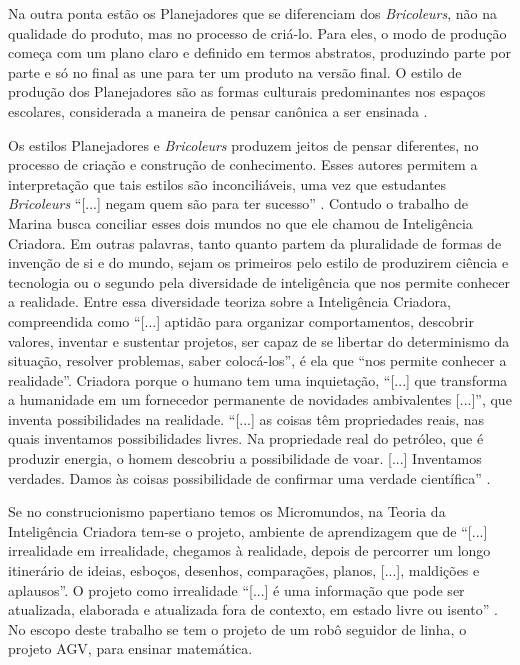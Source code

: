 \documentclass[portuguese]{textolivre}
\begin{document}
Na outra ponta estão os Planejadores que se diferenciam dos \emph{Bricoleurs}, não na qualidade do produto, mas no processo de criá-lo. Para eles, o modo de produção começa com um plano claro e definido em termos abstratos, produzindo parte por parte e só no final as une para ter um produto na versão final. O estilo de produção dos Planejadores são as formas culturais predominantes nos espaços escolares, considerada a maneira de pensar canônica a ser ensinada \cite{Papert1992}.

Os estilos Planejadores e \emph{Bricoleurs} produzem jeitos de pensar diferentes, no processo de criação e construção de conhecimento. Esses autores permitem a interpretação que tais estilos são inconciliáveis, uma vez que estudantes \emph{Bricoleurs} “[...] negam quem são para ter sucesso” \cite[p. 3]{Papert1992}. Contudo o trabalho de Marina \citeyear{Marina2009} busca conciliar esses dois mundos no que ele chamou de Inteligência Criadora. Em outras palavras, tanto \textcite{Papert1992} quanto \textcite{Marina2009} partem da pluralidade de formas de invenção de si e do mundo, sejam os primeiros pelo estilo de produzirem ciência e tecnologia ou o segundo pela diversidade de inteligência que nos permite conhecer a realidade. Entre essa diversidade \textcite[p. 6-9]{Marina2009} teoriza sobre a Inteligência Criadora, compreendida como “[...] aptidão para organizar comportamentos, descobrir valores, inventar e sustentar projetos, ser capaz de se libertar do determinismo da situação, resolver problemas, saber colocá-los”, é ela que “nos permite conhecer a realidade”. Criadora porque o humano tem uma inquietação, “[...] que transforma a humanidade em um fornecedor permanente de novidades ambivalentes [...]”, que inventa possibilidades na realidade. “[...] as coisas têm propriedades reais, nas quais inventamos possibilidades livres. Na propriedade real do petróleo, que é produzir energia, o homem descobriu a possibilidade de voar. [...] Inventamos verdades. Damos às coisas possibilidade de confirmar uma verdade científica” \cite [p. 10-11]{Marina2009}.

Se no construcionismo papertiano temos os Micromundos, na Teoria da Inteligência Criadora tem-se o projeto, ambiente de aprendizagem que de “[...] irrealidade em irrealidade, chegamos à realidade, depois de percorrer um longo itinerário de ideias, esboços, desenhos, comparações, planos, [...], maldições e aplausos”. O projeto como irrealidade “[...] é uma informação que pode ser atualizada, elaborada e atualizada fora de contexto, em estado livre ou isento” \cite[p. 205]{Marina2009}. No escopo deste trabalho se tem o projeto de um robô seguidor de linha, o projeto AGV, para ensinar matemática.
\end{document}
